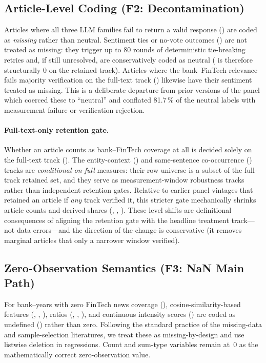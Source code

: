 \subsection{Article-Level Coding (F2: Decontamination)}
Articles where all three LLM families fail to return a valid response
() are coded as \emph{missing} rather than
neutral. Sentiment ties or no-vote outcomes ()
are not treated as missing: they trigger up to 80 rounds of
deterministic tie-breaking retries and, if still unresolved, are
conservatively coded as neutral ( is therefore
structurally 0 on the retained track). Articles where the
bank--FinTech relevance fails majority verification on the full-text
track ()
likewise have their sentiment treated as missing. This is a deliberate
departure from prior versions of the panel which coerced these to
``neutral'' and conflated 81.7\,\% of the neutral labels with measurement
failure or verification rejection.

\paragraph{Full-text-only retention gate.}
Whether an article counts as bank--FinTech coverage at all is decided
solely on the full-text track (). The
entity-context () and same-sentence co-occurrence
() tracks are \emph{conditional-on-full} measures: their row
universe is a subset of the full-track retained set, and they serve as
measurement-window robustness tracks rather than independent retention
gates. Relative to earlier panel vintages that retained an article if
\emph{any} track verified it, this stricter gate mechanically shrinks
article counts and derived shares (,
, ). These level shifts are
definitional consequences of aligning the retention gate with the
headline treatment track---not data errors---and the direction of the
change is conservative (it removes marginal articles that only a
narrower window verified).

\subsection{Zero-Observation Semantics (F3: NaN Main Path)}
For bank--years with zero FinTech news coverage (),
cosine-similarity-based features (,
, ), ratios
(, ,
), and continuous intensity scores
() are coded as undefined ()
rather than zero. Following the standard practice of the missing-data
and sample-selection literatures, we treat these as missing-by-design
and use listwise deletion in regressions.
Count and sum-type variables remain at~$0$ as the mathematically correct
zero-observation value.

